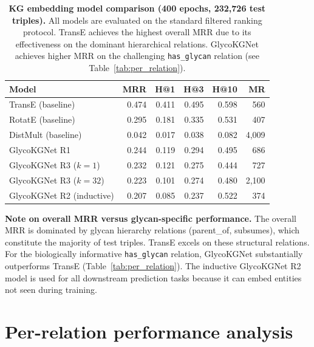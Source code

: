 \documentclass[11pt,a4paper]{article}
\begin{document}
\begin{table}[H]
\centering
\caption{\textbf{KG embedding model comparison (400 epochs, 232,726 test triples).}
All models are evaluated on the standard filtered ranking protocol. TransE
achieves the highest overall MRR due to its effectiveness on the dominant
hierarchical relations. GlycoKGNet achieves higher MRR on the challenging
\texttt{has\_glycan} relation (see Table~\ref{tab:per_relation}).}
\label{tab:kg_baselines}
\small
\begin{tabular}{lrrrrr}
\toprule
\textbf{Model} & \textbf{MRR} & \textbf{H@1} & \textbf{H@3} & \textbf{H@10} & \textbf{MR} \\
\midrule
TransE (baseline)    & 0.474 & 0.411 & 0.495 & 0.598 & 560 \\
RotatE (baseline)    & 0.295 & 0.181 & 0.335 & 0.531 & 407 \\
DistMult (baseline)  & 0.042 & 0.017 & 0.038 & 0.082 & 4,009 \\
\midrule
GlycoKGNet R1        & 0.244 & 0.119 & 0.294 & 0.495 & 686 \\
GlycoKGNet R3 ($k=1$)  & 0.232 & 0.121 & 0.275 & 0.444 & 727 \\
GlycoKGNet R3 ($k=32$) & 0.223 & 0.101 & 0.274 & 0.480 & 2,100 \\
\midrule
GlycoKGNet R2 (inductive) & 0.207 & 0.085 & 0.237 & 0.522 & 374 \\
\bottomrule
\end{tabular}
\end{table}

\textbf{Note on overall MRR versus glycan-specific performance.} The overall
MRR is dominated by glycan hierarchy relations (parent\_of, subsumes), which
constitute the majority of test triples. TransE excels on these structural
relations. For the biologically informative \texttt{has\_glycan} relation,
GlycoKGNet substantially outperforms TransE (Table~\ref{tab:per_relation}).
The inductive GlycoKGNet R2 model is used for all downstream prediction tasks
because it can embed entities not seen during training.

\section{Per-relation performance analysis}
\label{sec:per_relation}
\end{document}
